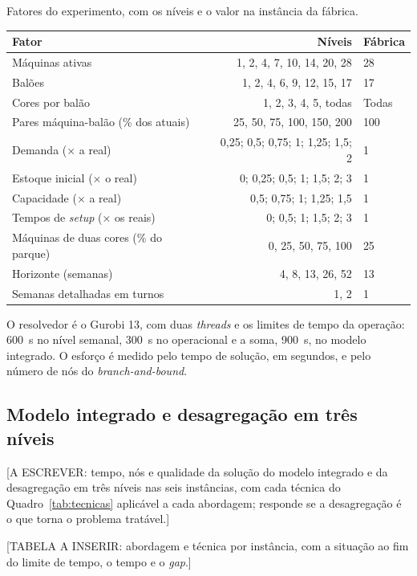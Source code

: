 \documentclass[
    12pt,
    openright,
    oneside,
    a4paper,
    fleqn,
    chapter=TITLE,
    section=TITLE,
    english,
    brazil
]{abntex2}
\begin{document}
\begin{quadro}[htbp]
\small
\caption{Fatores do experimento, com os níveis e o valor na instância da fábrica.}
\label{tab:fatores}
\begin{tabularx}{\linewidth}{@{}L{6.6cm}RL{1.6cm}@{}}
\toprule
Fator & Níveis & Fábrica \\
\midrule
Máquinas ativas & 1, 2, 4, 7, 10, 14, 20, 28 & 28 \\
Balões & 1, 2, 4, 6, 9, 12, 15, 17 & 17 \\
Cores por balão & 1, 2, 3, 4, 5, todas & Todas \\
Pares máquina-balão (\% dos atuais) & 25, 50, 75, 100, 150, 200 & 100 \\
Demanda (× a real) & 0,25; 0,5; 0,75; 1; 1,25; 1,5; 2 & 1 \\
Estoque inicial (× o real) & 0; 0,25; 0,5; 1; 1,5; 2; 3 & 1 \\
Capacidade (× a real) & 0,5; 0,75; 1; 1,25; 1,5 & 1 \\
Tempos de \textit{setup} (× os reais) & 0; 0,5; 1; 1,5; 2; 3 & 1 \\
Máquinas de duas cores (\% do parque) & 0, 25, 50, 75, 100 & 25 \\
Horizonte (semanas) & 4, 8, 13, 26, 52 & 13 \\
Semanas detalhadas em turnos & 1, 2 & 1 \\
\bottomrule
\end{tabularx}
\end{quadro}

O resolvedor é o Gurobi 13, com duas \textit{threads} e os limites de tempo da operação: 600~s no nível semanal, 300~s no operacional e a soma, 900~s, no modelo integrado. O esforço é medido pelo tempo de solução, em segundos, e pelo número de nós do \textit{branch-and-bound}.

\subsection{Modelo integrado e desagregação em três níveis}
\label{sec:resultado_arquitetura}

[A ESCREVER: tempo, nós e qualidade da solução do modelo integrado e da desagregação em três níveis nas seis instâncias, com cada técnica do Quadro~\ref{tab:tecnicas} aplicável a cada abordagem; responde se a desagregação é o que torna o problema tratável.]

[TABELA A INSERIR: abordagem e técnica por instância, com a situação ao fim do limite de tempo, o tempo e o \textit{gap}.]
\end{document}
